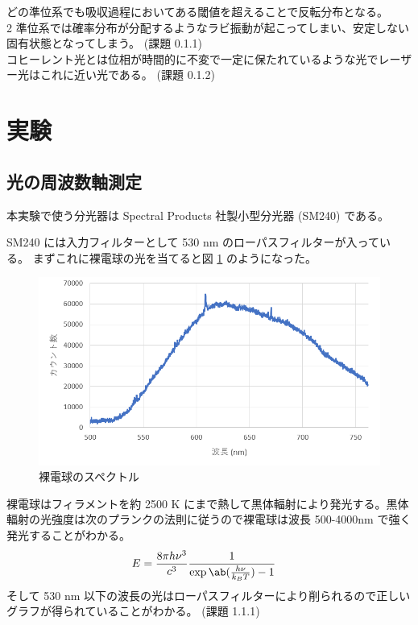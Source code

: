\documentclass[uplatex,dvipdfmx,a4paper,11pt]{jlreq}
\numberwithin{equation}{section}
\theoremstyle{definition}
\begin{document}
どの準位系でも吸収過程においてある閾値を超えることで反転分布となる。 \\

2 準位系では確率分布が分配するようなラビ振動が起こってしまい、安定しない固有状態となってしまう。
(課題 0.1.1) \\

コヒーレント光とは位相が時間的に不変で一定に保たれているような光でレーザー光はこれに近い光である。
(課題 0.1.2)

\section{実験}

\subsection{光の周波数軸測定}
本実験で使う分光器は Spectral Products 社製小型分光器 (SM240) である。

SM240 には入力フィルターとして 530 \si{nm} のローパスフィルターが入っている。
まずこれに裸電球の光を当てると図 \ref{fig:bare light} のようになった。
\begin{figure}[htbp]
  \centering
  \includegraphics[width=14cm]{./assets/bare_light_bulb.png}
  \caption{裸電球のスペクトル}
  \label{fig:bare light}
\end{figure}
裸電球はフィラメントを約 2500 \si{K} にまで熱して黒体輻射により発光する。黒体輻射の光強度は次のプランクの法則に従うので裸電球は波長 500-4000\si{nm} で強く発光することがわかる。
\begin{align}
  E & = \frac{8\pi h\nu^3}{c^3}\frac{1}{\exp\ab(\frac{h\nu}{k_BT}) - 1}
\end{align}
そして 530 \si{nm} 以下の波長の光はローパスフィルターにより削られるので正しいグラフが得られていることがわかる。
(課題 1.1.1) \\
\end{document}

